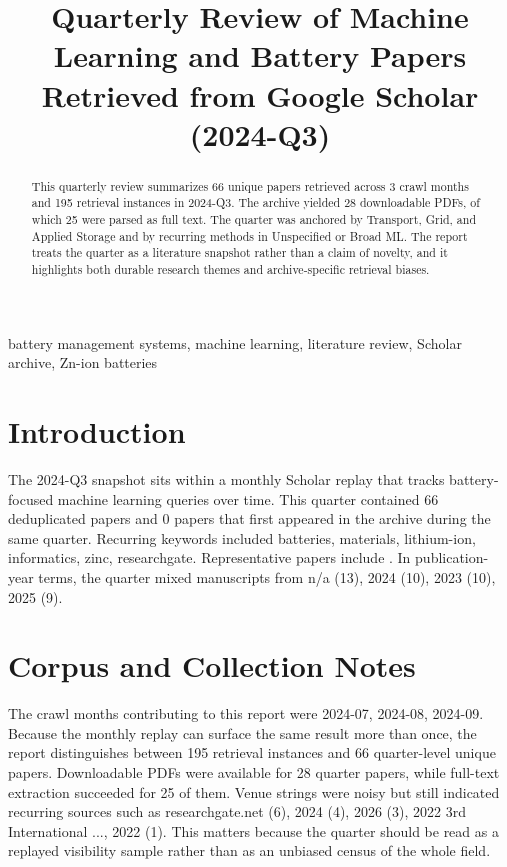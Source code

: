 \documentclass[conference]{IEEEtran}
\begin{document}
\title{ Quarterly Review of Machine Learning and Battery Papers Retrieved from Google Scholar (2024-Q3) }

\author{
}

\maketitle

\begin{abstract}
This quarterly review summarizes 66 unique papers retrieved across 3 crawl months and 195 retrieval instances in 2024-Q3. The archive yielded 28 downloadable PDFs, of which 25 were parsed as full text. The quarter was anchored by Transport, Grid, and Applied Storage and by recurring methods in Unspecified or Broad ML. The report treats the quarter as a literature snapshot rather than a claim of novelty, and it highlights both durable research themes and archive-specific retrieval biases.
\end{abstract}

\begin{IEEEkeywords}
battery management systems, machine learning, literature review, Scholar archive, Zn-ion batteries
\end{IEEEkeywords}

\section{Introduction}
The 2024-Q3 snapshot sits within a monthly Scholar replay that tracks battery-focused machine learning queries over time. This quarter contained 66 deduplicated papers and 0 papers that first appeared in the archive during the same quarter. Recurring keywords included batteries, materials, lithium-ion, informatics, zinc, researchgate. Representative papers include \cite{machinelearningdriven2025,socestimationof2023,textminingfor2022,recentadvancesin2025}. In publication-year terms, the quarter mixed manuscripts from n/a (13), 2024 (10), 2023 (10), 2025 (9).

\section{Corpus and Collection Notes}
The crawl months contributing to this report were 2024-07, 2024-08, 2024-09. Because the monthly replay can surface the same result more than once, the report distinguishes between 195 retrieval instances and 66 quarter-level unique papers. Downloadable PDFs were available for 28 quarter papers, while full-text extraction succeeded for 25 of them. Venue strings were noisy but still indicated recurring sources such as researchgate.net (6), 2024 (4), 2026 (3), 2022 3rd International ..., 2022 (1). This matters because the quarter should be read as a replayed visibility sample rather than as an unbiased census of the whole field.
\end{document}

